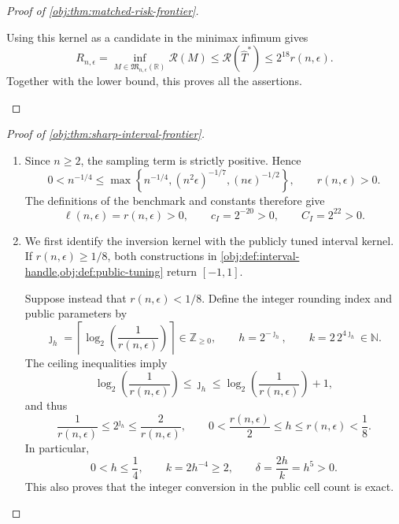 \begin{proof}[Proof of \cref{obj:thm:matched-risk-frontier}]
\begin{enumerate}
Using this kernel as a candidate in the minimax infimum gives
\[
R_{n,\epsilon}
=
\inf_{M\in\mathfrak M_{n,\epsilon}(\mathbb R)}\mathcal R(M)
\le
\mathcal R(\widehat T^*)
\le
2^{18}r(n,\epsilon).
\]
Together with the lower bound, this proves all the assertions.
\end{enumerate}
\end{proof}

\begin{proof}[Proof of \cref{obj:thm:sharp-interval-frontier}]
\begin{enumerate}
\item Since \(n\ge2\), the sampling term is strictly positive. Hence
\[
0<n^{-1/4}
\le
\max\left\{
n^{-1/4},(n^2\epsilon)^{-1/7},(n\epsilon)^{-1/2}
\right\},
\qquad
r(n,\epsilon)>0.
\]
The definitions of the benchmark and constants therefore give
\[
\ell(n,\epsilon)=r(n,\epsilon)>0,
\qquad
c_I=2^{-20}>0,
\qquad
C_I=2^{22}>0.
\]

\item We first identify the inversion kernel with the publicly tuned interval kernel. If \(r(n,\epsilon)\ge1/8\), both constructions in
\cref{obj:def:interval-handle,obj:def:public-tuning} return \([-1,1]\).

Suppose instead that \(r(n,\epsilon)<1/8\). Define the integer rounding index and public parameters by
\[
\jmath_h
=
\left\lceil\log_2\!\left(\frac1{r(n,\epsilon)}\right)\right\rceil
\in\mathbb Z_{\ge0},
\qquad
h=2^{-\jmath_h},
\qquad
k=2\,2^{4\jmath_h}\in\mathbb N.
\]
The ceiling inequalities imply
\[
\log_2\!\left(\frac1{r(n,\epsilon)}\right)
\le\jmath_h
\le
\log_2\!\left(\frac1{r(n,\epsilon)}\right)+1,
\]
and thus
\[
\frac1{r(n,\epsilon)}
\le2^{\jmath_h}
\le\frac2{r(n,\epsilon)},
\qquad
0<\frac{r(n,\epsilon)}2\le h\le r(n,\epsilon)<\frac18.
\]
In particular,
\[
0<h\le\frac14,
\qquad
k=2h^{-4}\ge2,
\qquad
\delta=\frac{2h}{k}=h^5>0.
\]
This also proves that the integer conversion in the public cell count is exact.


\end{enumerate}
\end{proof}
